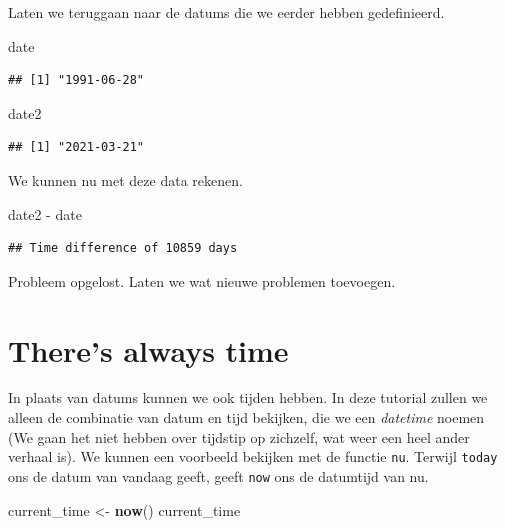 \documentclass[]{tufte-book}
\newenvironment{Shaded}{}{}
\newcommand{\KeywordTok}[1]{\textcolor[rgb]{0.00,0.44,0.13}{\textbf{#1}}}
\newcommand{\NormalTok}[1]{#1}
\newcommand{\OperatorTok}[1]{\textcolor[rgb]{0.40,0.40,0.40}{#1}}
\newcommand{\StringTok}[1]{\textcolor[rgb]{0.25,0.44,0.63}{#1}}
\begin{document}
Laten we teruggaan naar de datums die we eerder hebben gedefinieerd.

\begin{Shaded}
\begin{Highlighting}[]
\NormalTok{date}
\end{Highlighting}
\end{Shaded}

\begin{verbatim}
## [1] "1991-06-28"
\end{verbatim}

\begin{Shaded}
\begin{Highlighting}[]
\NormalTok{date2}
\end{Highlighting}
\end{Shaded}

\begin{verbatim}
## [1] "2021-03-21"
\end{verbatim}

We kunnen nu met deze data rekenen.

\begin{Shaded}
\begin{Highlighting}[]
\NormalTok{date2 }\OperatorTok{-}\StringTok{ }\NormalTok{date}
\end{Highlighting}
\end{Shaded}

\begin{verbatim}
## Time difference of 10859 days
\end{verbatim}

Probleem opgelost. Laten we wat nieuwe problemen toevoegen.

\hypertarget{theres-always-time}{%
\section{There's always time}\label{theres-always-time}}

In plaats van datums kunnen we ook tijden hebben. In deze tutorial zullen we alleen de combinatie van datum en tijd bekijken, die we een \emph{datetime} noemen (We gaan het niet hebben over tijdstip op zichzelf, wat weer een heel ander verhaal is). We kunnen een voorbeeld bekijken met de functie \texttt{nu}. Terwijl \texttt{today} ons de datum van vandaag geeft, geeft \texttt{now} ons de datumtijd van nu.

\begin{Shaded}
\begin{Highlighting}[]
\NormalTok{current_time <-}\StringTok{ }\KeywordTok{now}\NormalTok{()}
\NormalTok{current_time}
\end{Highlighting}
\end{Shaded}
\end{document}
